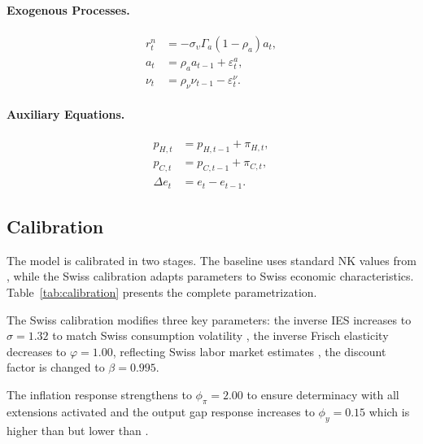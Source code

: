\documentclass[12pt,a4paper]{article}
\begin{document}
\paragraph{Exogenous Processes.}
\begin{align}
	r_t^n &= -\sigma_\upsilon\Gamma_a(1-\rho_a)a_t, \tag{Natural rate} \label{eq:sys_rnat} \\
	a_t &= \rho_a a_{t-1} + \varepsilon_t^a, \tag{Technology} \label{eq:sys_a} \\
	\nu_t &= \rho_\nu\nu_{t-1} - \varepsilon_t^\nu. \tag{Policy shock} \label{eq:sys_nu}
\end{align}

\paragraph{Auxiliary Equations.}
\begin{align}
	p_{H,t} &= p_{H,t-1} + \pi_{H,t}, \tag{Domestic prices} \label{eq:sys_pH} \\
	p_{C,t} &= p_{C,t-1} + \pi_{C,t}, \tag{CPI} \label{eq:sys_pC} \\
	\Delta e_t &= e_t - e_{t-1}. \tag{ER change} \label{eq:sys_de}
\end{align}

\subsection{Calibration}
\label{subsec:calibration}
The model is calibrated in two stages. The baseline uses standard NK values from \citet{gali2008}, while the Swiss calibration adapts parameters to Swiss economic characteristics. Table~\ref{tab:calibration} presents the complete parametrization.

The Swiss calibration modifies three key parameters: the inverse IES increases to $\sigma = 1.32$ to match Swiss consumption volatility \citep{cuchecurti2009, rudolf2014}, the inverse Frisch elasticity decreases to $\varphi = 1.00$, reflecting Swiss labor market estimates \citep{rudolf2014}, the discount factor is changed to $\beta = 0.995$.

The inflation response strengthens to $\phi_\pi = 2.00$ to ensure determinacy with all extensions activated and the output gap response increases to $\phi_y = 0.15$ which is higher than \citet{cuchecurti2009} but lower than \citet{rudolf2014}.
\end{document}
